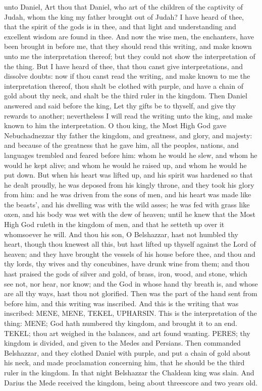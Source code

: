 unto Daniel, Art thou that Daniel, who art of the children of the captivity of Judah, whom the king my father brought out of Judah? I have heard of thee, that the spirit of the gods is in thee, and that light and understanding and excellent wisdom are found in thee. And now the wise men, the enchanters, have been brought in before me, that they should read this writing, and make known unto me the interpretation thereof; but they could not show the interpretation of the thing. But I have heard of thee, that thou canst give interpretations, and dissolve doubts: now if thou canst read the writing, and make known to me the interpretation thereof, thou shalt be clothed with purple, and have a chain of gold about thy neck, and shalt be the third ruler in the kingdom.  Then Daniel answered and said before the king, Let thy gifts be to thyself, and give thy rewards to another; nevertheless I will read the writing unto the king, and make known to him the interpretation. O thou king, the Most High God gave Nebuchadnezzar thy father the kingdom, and greatness, and glory, and majesty: and because of the greatness that he gave him, all the peoples, nations, and languages trembled and feared before him: whom he would he slew, and whom he would he kept alive; and whom he would he raised up, and whom he would he put down. But when his heart was lifted up, and his spirit was hardened so that he dealt proudly, he was deposed from his kingly throne, and they took his glory from him: and he was driven from the sons of men, and his heart was made like the beasts’, and his dwelling was with the wild asses; he was fed with grass like oxen, and his body was wet with the dew of heaven; until he knew that the Most High God ruleth in the kingdom of men, and that he setteth up over it whomsoever he will. And thou his son, O Belshazzar, hast not humbled thy heart, though thou knewest all this, but hast lifted up thyself against the Lord of heaven; and they have brought the vessels of his house before thee, and thou and thy lords, thy wives and thy concubines, have drunk wine from them; and thou hast praised the gods of silver and gold, of brass, iron, wood, and stone, which see not, nor hear, nor know; and the God in whose hand thy breath is, and whose are all thy ways, hast thou not glorified. Then was the part of the hand sent from before him, and this writing was inscribed.  And this is the writing that was inscribed: MENE, MENE, TEKEL, UPHARSIN. This is the interpretation of the thing: MENE; God hath numbered thy kingdom, and brought it to an end. TEKEL; thou art weighed in the balances, and art found wanting. PERES; thy kingdom is divided, and given to the Medes and Persians.  Then commanded Belshazzar, and they clothed Daniel with purple, and put a chain of gold about his neck, and made proclamation concerning him, that he should be the third ruler in the kingdom.  In that night Belshazzar the Chaldean king was slain. And Darius the Mede received the kingdom, being about threescore and two years old. 

